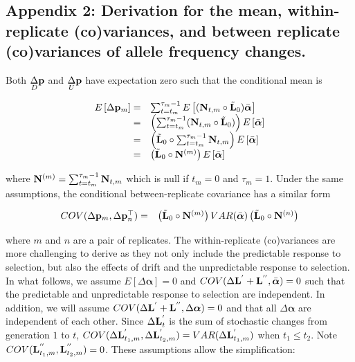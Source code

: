\documentclass[12pt]{article}
\begin{document}
\begin{bibunit}
\section{Appendix 2: Derivation for the mean, within-replicate (co)variances, and between replicate (co)variances of allele frequency changes.}
\label{App:dist}

Both $\underset{D}\Delta {\bf p}$ and $\underset{U}\Delta {\bf p}$ have expectation zero such that the conditional mean is

\begin{equation}
\begin{array}{rl}
E\left[\Delta {\bf p}_m\right] =& \sum_{t=t_m}^{\tau_m-1}E\left[({\bf N}_{t,m}\circ\tilde{\bf L}_0)\bar{\boldsymbol{\alpha}}\right]\\
=& \left(\sum_{t=t_m}^{\tau_m-1}({\bf N}_{t,m}\circ\tilde{\bf L}_0)\right)E\left[\bar{\boldsymbol{\alpha}}\right]\\


=& \left(\tilde{\bf L}_0\circ\sum_{t=t_m}^{\tau_m-1}{\bf N}_{t,m}\right)E\left[\bar{\boldsymbol{\alpha}}\right]\\
=& \left(\tilde{\bf L}_0\circ{\bf N}^{(m)}\right)E\left[\bar{\boldsymbol{\alpha}}\right]\\
\end{array}
\end{equation}

where ${\bf N}^{(m)}=\sum_{t=t_m}^{\tau_m-1}{\bf N}_{t,m}$ which is null if $t_m=0$ and $\tau_m=1$. Under the same assumptions, the conditional between-replicate covariance has a similar form 

\begin{equation}
\begin{array}{rl}
COV(\Delta {\bf p}_m, \Delta {\bf p}_n^{\top})
=&\left(\tilde{\bf L}_0\circ{\bf N}^{(m)}\right)VAR(\bar{\boldsymbol{\alpha}})\left(\tilde{\bf L}_0\circ{\bf N}^{(n)}\right)\\
\end{array}
\end{equation}

where $m$ and $n$ are a pair of replicates. The within-replicate (co)variances are more challenging to derive as they not only include the predictable response to selection, but also the effects of drift and the unpredictable response to selection. In what follows, we assume $E\left[\Delta\boldsymbol{\alpha}\right]=0$ and $COV(\Delta{\bf L}^{'}+{\bf L}^{''}, \bar{\boldsymbol{\alpha}})=0$ such that the predictable and unpredictable response to selection are independent. In addition, we will assume $COV(\Delta{\bf L}^{'}+{\bf L}^{''}, \Delta\boldsymbol{\alpha})=0$ and that all $\Delta\boldsymbol{\alpha}$ are independent of each other. Since $\Delta {\bf L}^{'}_t$ is the sum of stochastic changes from generation $1$ to $t$, $COV(\Delta {\bf L}^{'}_{t_1, m}, \Delta {\bf L}^{'}_{t_2, m})=VAR(\Delta {\bf L}^{'}_{t_1, m})$ when $t_1\leq t_2$. Note $COV({\bf L}^{''}_{t_1, m}, {\bf L}^{''}_{t_2, m})=0$. These assumptions allow the simplification:


\end{bibunit}
\end{document}
